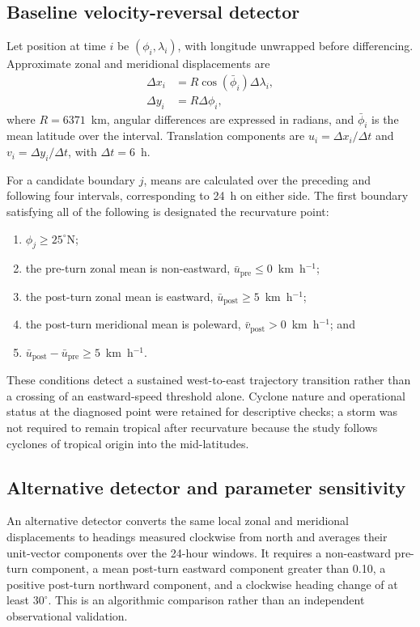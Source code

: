 \documentclass[11pt]{article}
\begin{document}
\subsection{Baseline velocity-reversal detector}
Let position at time \(i\) be \((\phi_i,\lambda_i)\), with longitude unwrapped before differencing. Approximate zonal and meridional displacements are
\begin{align}
\Delta x_i &= R\cos(\bar{\phi}_i)\Delta\lambda_i,\\
\Delta y_i &= R\Delta\phi_i,
\end{align}
where \(R=6371\)~km, angular differences are expressed in radians, and \(\bar{\phi}_i\) is the mean latitude over the interval. Translation components are \(u_i=\Delta x_i/\Delta t\) and \(v_i=\Delta y_i/\Delta t\), with \(\Delta t=6\)~h.

For a candidate boundary \(j\), means are calculated over the preceding and following four intervals, corresponding to 24~h on either side. The first boundary satisfying all of the following is designated the recurvature point:
\begin{enumerate}
    \item \(\phi_j\geq25^\circ\)N;
    \item the pre-turn zonal mean is non-eastward, \(\bar{u}_{\mathrm{pre}}\leq0\)~km~h\(^{-1}\);
    \item the post-turn zonal mean is eastward, \(\bar{u}_{\mathrm{post}}\geq5\)~km~h\(^{-1}\);
    \item the post-turn meridional mean is poleward, \(\bar{v}_{\mathrm{post}}>0\)~km~h\(^{-1}\); and
    \item \(\bar{u}_{\mathrm{post}}-\bar{u}_{\mathrm{pre}}\geq5\)~km~h\(^{-1}\).
\end{enumerate}
These conditions detect a sustained west-to-east trajectory transition rather than a crossing of an eastward-speed threshold alone. Cyclone nature and operational status at the diagnosed point were retained for descriptive checks; a storm was not required to remain tropical after recurvature because the study follows cyclones of tropical origin into the mid-latitudes.

\subsection{Alternative detector and parameter sensitivity}
An alternative detector converts the same local zonal and meridional displacements to headings measured clockwise from north and averages their unit-vector components over the 24-hour windows. It requires a non-eastward pre-turn component, a mean post-turn eastward component greater than 0.10, a positive post-turn northward component, and a clockwise heading change of at least \(30^\circ\). This is an algorithmic comparison rather than an independent observational validation.
\end{document}
